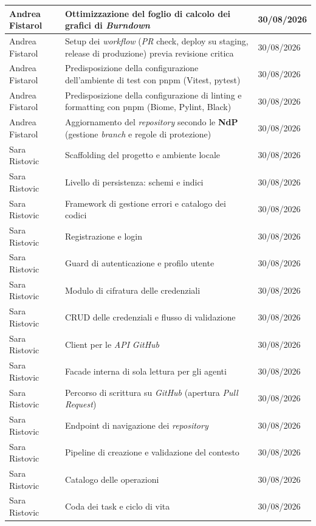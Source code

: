 \documentclass[12pt, a4paper]{article}
\begin{document}
\begin{xltabular}{\textwidth}{|l|X|l|}
    Andrea Fistarol & Ottimizzazione del foglio di calcolo dei grafici di \textit{Burndown} & 30/08/2026 \\ \hline
    Andrea Fistarol & Setup dei \textit{workflow} (\textit{PR} check, deploy su staging, release di produzione) previa revisione critica & 30/08/2026 \\ \hline
    Andrea Fistarol & Predisposizione della configurazione dell'ambiente di test con pnpm (Vitest, pytest) & 30/08/2026 \\ \hline
    Andrea Fistarol & Predisposizione della configurazione di linting e formatting con pnpm (Biome, Pylint, Black) & 30/08/2026 \\ \hline
    Andrea Fistarol & Aggiornamento del \textit{repository} secondo le \textbf{NdP} (gestione \textit{branch} e regole di protezione) & 30/08/2026 \\ \hline
    Sara Ristovic & Scaffolding del progetto e ambiente locale & 30/08/2026 \\ \hline
    Sara Ristovic & Livello di persistenza: schemi e indici & 30/08/2026 \\ \hline
    Sara Ristovic & Framework di gestione errori e catalogo dei codici & 30/08/2026 \\ \hline
    Sara Ristovic & Registrazione e login & 30/08/2026 \\ \hline
    Sara Ristovic & Guard di autenticazione e profilo utente & 30/08/2026 \\ \hline
    Sara Ristovic & Modulo di cifratura delle credenziali & 30/08/2026 \\ \hline
    Sara Ristovic & CRUD delle credenziali e flusso di validazione & 30/08/2026 \\ \hline
    Sara Ristovic & Client per le \textit{API} \textit{GitHub} & 30/08/2026 \\ \hline
    Sara Ristovic & Facade interna di sola lettura per gli agenti & 30/08/2026 \\ \hline
    Sara Ristovic & Percorso di scrittura su \textit{GitHub} (apertura \textit{Pull Request}) & 30/08/2026 \\ \hline
    Sara Ristovic & Endpoint di navigazione dei \textit{repository} & 30/08/2026 \\ \hline
    Sara Ristovic & Pipeline di creazione e validazione del contesto & 30/08/2026 \\ \hline
    Sara Ristovic & Catalogo delle operazioni & 30/08/2026 \\ \hline
    Sara Ristovic & Coda dei task e ciclo di vita & 30/08/2026 \\ \hline

\end{xltabular}
\end{document}
